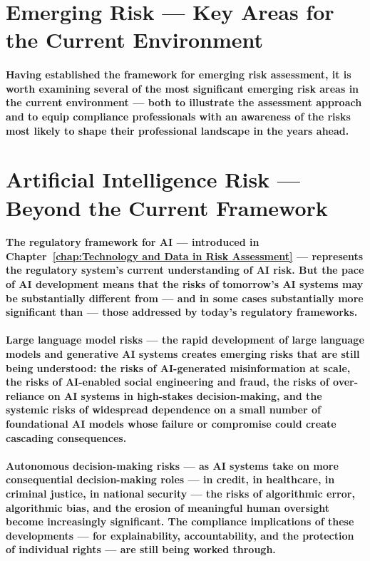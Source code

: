 \section{Emerging Risk — Key Areas for the Current Environment}
\paragraph{Having established the framework for emerging risk assessment, it is worth examining several of the most significant emerging risk areas in the current environment — both to illustrate the assessment approach and to equip compliance professionals with an awareness of the risks most likely to shape their professional landscape in the years ahead.}

\section{Artificial Intelligence Risk — Beyond the Current Framework}
\paragraph{The regulatory framework for AI — introduced in Chapter~\ref{chap:Technology and Data in Risk Assessment} — represents the regulatory system's current understanding of AI risk. But the pace of AI development means that the risks of tomorrow's AI systems may be substantially different from — and in some cases substantially more significant than — those addressed by today's regulatory frameworks.}
\paragraph{\textbf{Large language model risks} — the rapid development of large language models and generative AI systems creates emerging risks that are still being understood: the risks of AI-generated misinformation at scale, the risks of AI-enabled social engineering and fraud, the risks of over-reliance on AI systems in high-stakes decision-making, and the systemic risks of widespread dependence on a small number of foundational AI models whose failure or compromise could create cascading consequences.}
\paragraph{\textbf{Autonomous decision-making risks} — as AI systems take on more consequential decision-making roles — in credit, in healthcare, in criminal justice, in national security — the risks of algorithmic error, algorithmic bias, and the erosion of meaningful human oversight become increasingly significant. The compliance implications of these developments — for explainability, accountability, and the protection of individual rights — are still being worked through.}
